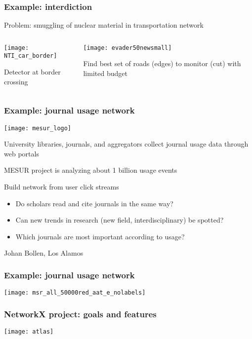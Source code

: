 \documentclass[xcolor=dvipsnames, 9pt]{beamer}
\begin{document}
\begin{frame}
\frametitle{Example: interdiction}
Problem: smuggling of nuclear material in transportation network
\begin{columns}
\begin{column}{0.5\textwidth}
\centerline{\texttt{[image: NTI\_car\_border]}}
\centerline{\small Detector at border crossing}
\end{column}
\begin{column}{0.5\textwidth}
\centerline{\texttt{[image: evader50newsmall]}}
Find best set of roads (edges) to monitor (cut) with limited budget
\end{column}
\end{columns}
\end{frame}


\begin{frame}
\frametitle{Example: journal usage network}

\centerline{\texttt{[image: mesur\_logo]}}

\bigskip

University libraries, journals, and aggregators collect 
journal usage data through web portals 

MESUR project is analyzing about 1 billion usage events

Build network from user click streams

\begin{itemize}
\item Do scholars read and cite journals in the same way?
\item Can new trends in research (new field, interdisciplinary) be
  spotted?
\item Which journals are most important according to usage?
\end{itemize}

Johan Bollen, Los Alamos

\end{frame}


\begin{frame}
\frametitle{Example: journal usage network}

\centerline{\texttt{[image: msr\_all\_50000red\_aat\_e\_nolabels]}}

\end{frame}

\begin{frame}
\frametitle{NetworkX project: goals and features}
\centerline{\texttt{[image: atlas]}}


\end{frame}
\end{document}

